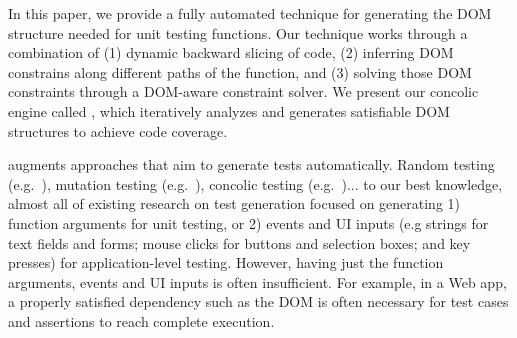In this paper, we provide a fully automated technique for generating the DOM structure needed for unit testing \js functions. Our technique works through a combination of (1) dynamic backward slicing of \js code, (2) inferring DOM constrains along different paths of the function, and (3) solving those DOM constraints through a DOM-aware constraint solver. We present our concolic engine called \tool, which iteratively analyzes \js  and generates satisfiable DOM structures to achieve code coverage. 

\tool augments approaches that aim to generate tests automatically.  
Random testing (e.g.~\cite{artemis}), mutation testing (e.g.~\cite{pythia}), concolic testing (e.g.~\cite{eventConcolic, feedbackConcolic, kudzu, jalangi, cute})... 
to our best knowledge, almost all of existing research on test generation focused on generating 1) function arguments for unit testing, or 2) events and UI inputs (e.g strings for text fields and forms; mouse clicks for buttons and selection boxes; and key presses) for application-level testing.  
However, having just the function arguments, events and UI inputs is often insufficient.  
For example, in a Web app, a properly satisfied dependency such as the DOM is often necessary for test cases and assertions to reach complete execution.  








